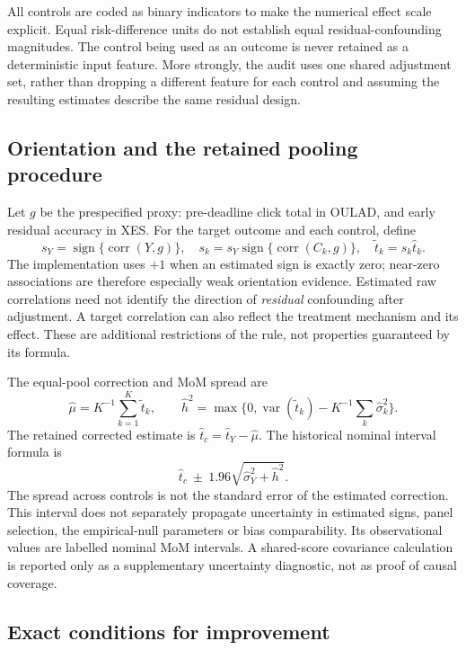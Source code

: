 All controls are coded as binary indicators to make the numerical effect scale explicit. Equal risk-difference units do not establish equal residual-confounding magnitudes. The control being used as an outcome is never retained as a deterministic input feature. More strongly, the audit uses one shared adjustment set, rather than dropping a different feature for each control and assuming the resulting estimates describe the same residual design.

\subsection{Orientation and the retained pooling procedure}

Let $g$ be the prespecified proxy: pre-deadline click total in OULAD, and early residual accuracy in XES. For the target outcome and each control, define
\[
s_Y=\operatorname{sign}\{\operatorname{corr}(Y,g)\},\quad
s_k=s_Y\operatorname{sign}\{\operatorname{corr}(C_k,g)\},\quad
\widetilde t_k=s_k\widehat t_k.
\]
The implementation uses $+1$ when an estimated sign is exactly zero; near-zero associations are therefore especially weak orientation evidence. Estimated raw correlations need not identify the direction of \emph{residual} confounding after adjustment. A target correlation can also reflect the treatment mechanism and its effect. These are additional restrictions of the rule, not properties guaranteed by its formula.

The equal-pool correction and MoM spread are
\[
\widehat\mu=K^{-1}\sum_{k=1}^K\widetilde t_k,\qquad
\widehat h^2=\max\{0,\operatorname{var}(\widetilde t_k)-K^{-1}\sum_k\widehat\sigma_k^2\}.
\]
The retained corrected estimate is $\widehat t_c=\widehat t_Y-\widehat\mu$. The historical nominal interval formula is
\[
\widehat t_c\ \pm\ 1.96\sqrt{\widehat\sigma_Y^2+\widehat h^2}.
\]
The spread across controls is not the standard error of the estimated correction. This interval does not separately propagate uncertainty in estimated signs, panel selection, the empirical-null parameters or bias comparability. Its observational values are labelled nominal MoM intervals. A shared-score covariance calculation is reported only as a supplementary uncertainty diagnostic, not as proof of causal coverage.

\subsection{Exact conditions for improvement}

